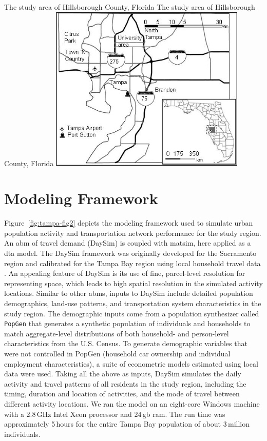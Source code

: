 \createfigure%
{The study area of Hillsborough County, Florida}%
{The study area of Hillsborough County, Florida}%
{\label{fig:tampa-fig1}}%
{\includegraphics[width=0.7\textwidth, angle=0]{./scenarios/figures/tampa-fig1.jpg}}%
{\citet[][]{GurramEtAl_AQAH_2015}}

\section{Modeling Framework}
Figure~\ref{fig:tampa-fig2} depicts the modeling framework used to simulate urban population activity and transportation network performance for the study region. 
An \gls{abm} of travel demand (DaySim) is coupled with \gls{matsim}, here applied as a \gls{dta} model. 
The DaySim framework was originally developed for the Sacramento region \citep[][]{BradleyEtAl_JOCM_2010} and calibrated for the Tampa Bay region using local household travel data \citep[][]{GliebeEtAl_TRB_2014}. 
An appealing feature of DaySim is its use of fine, parcel-level resolution for representing space, which leads to high spatial resolution in the simulated activity locations.  
Similar to other \glspl{abm}, inputs to DaySim include detailed population demographics, land-use patterns, and transportation system characteristics in the study region. The demographic inputs come from a population synthesizer called \lstinline|PopGen| \citep[][]{PendyalaEtAl_2011} that generates a synthetic population of individuals and households to match aggregate-level distributions of both household- and person-level characteristics from the U.S. Census. 
To generate demographic variables that were not controlled in PopGen (\eg household car ownership and individual employment characteristics), a suite of econometric models estimated using local data were used. 
Taking all the above as inputs, DaySim simulates the daily activity and travel patterns of all residents in the study region, including the timing, duration and location of activities, and the mode of travel between different activity locations. 
We ran the model on an eight-core Windows machine with a 2.8\,GHz Intel Xeon processor and 24\,\gls{gb} \gls{ram}. 
The run time was approximately 5\,hours for the entire Tampa Bay population of about 3\,million individuals.

